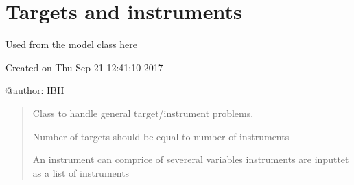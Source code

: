 \documentclass[letterpaper,10pt,english]{sphinxmanual}
\begin{document}
\chapter{Targets and instruments}
\label{\detokenize{index:targets-and-instruments}}
\sphinxAtStartPar
Used from the model class here  {\hyperref[\detokenize{index:modelclass.Solver_Mixin.invert}]{}}

\label{\detokenize{index:module-modelinvert}}
\sphinxAtStartPar
Created on Thu Sep 21 12:41:10 2017

\sphinxAtStartPar
@author: IBH
\begin{quote}

\sphinxAtStartPar
Class to handle general target/instrument problems.

\sphinxAtStartPar
Number of targets should be equal to number of instruments

\sphinxAtStartPar
An instrument can comprice of severeral variables
instruments are inputtet as a list of instruments
\end{quote}
\end{document}
